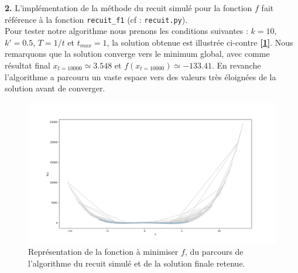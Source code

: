 \documentclass[12pt]{article}
\begin{document}
\begin{minipage}{0.5\textwidth}
\textbf{\color{brick}2.} L'implémentation de la méthode du recuit simulé pour la fonction $f$  fait référence à la fonction \verb|recuit_f1| (cf : \verb|recuit.py|).\\
 Pour tester notre algorithme nous prenons les conditions suivantes : $k=10$, $k'=0.5$, $T=1/t$ et $t_{max}=1$, la solution obtenue est illustrée ci-contre \textbf{[\ref{Q1_2}]}. Nous remarquons que la solution converge vers le minimum global, avec comme résultat final $x_{t=10000} \simeq 3.548  $ et $f(x_{t=10000}) \simeq -133.41$. En revanche l'algorithme a parcouru un vaste espace vers des valeurs très éloignées de la solution avant de converger.
\end{minipage} \hfill
\begin{minipage}{0.45\textwidth}
\begin{figure}[H]
\includegraphics[width=1\textwidth]{Q1_2.png}
\caption{Représentation de la fonction à minimiser  $f$, du parcours de l'algorithme du recuit simulé et de la solution finale retenue.}
\label{Q1_2}
\end{figure}
\end{minipage}
\end{document}
